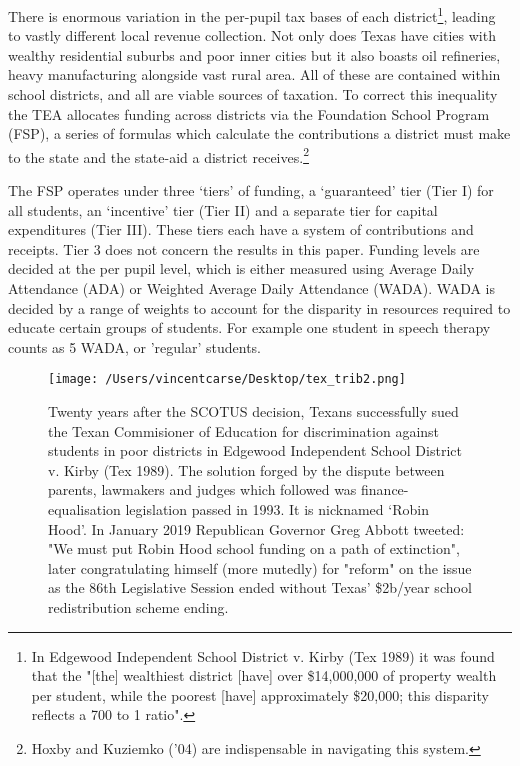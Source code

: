 \documentclass[11pt]{article}
\begin{document}
There is enormous variation in the per-pupil tax bases of each district\footnote{In Edgewood Independent School District v. Kirby (Tex 1989) it was found that the "[the] wealthiest district [have] over \$14,000,000 of property wealth per student, while the poorest [have] approximately \$20,000; this disparity reflects a 700 to 1 ratio". }, leading to vastly different local revenue collection. Not only does Texas have cities with wealthy residential suburbs and poor inner cities but it also boasts oil refineries, heavy manufacturing alongside vast rural area. All of these are contained within school districts, and all are viable sources of taxation. To correct this inequality the TEA allocates funding across districts via the Foundation School Program (FSP), a series of formulas which calculate the contributions a district must make to the state and the state-aid a district receives.\footnote{Hoxby and Kuziemko ('04) are indispensable in navigating this system.} 

The FSP operates under three ‘tiers’ of funding, a ‘guaranteed’ tier (Tier I) for all students, an ‘incentive’ tier (Tier II) and a separate tier for capital expenditures (Tier III). These tiers each have a system of contributions and receipts. Tier 3 does not concern the results in this paper. Funding levels are decided at the per pupil level, which is either measured using Average Daily Attendance (ADA) or Weighted Average Daily Attendance (WADA). WADA is decided by a range of weights to account for the disparity in resources required to educate certain groups of students. For example one student in speech therapy counts as 5 WADA, or 'regular' students.  

\begin{figure}
    \label{image-myimage}
    \texttt{[image: /Users/vincentcarse/Desktop/tex\_trib2.png]}
    \caption{Twenty years after the SCOTUS decision, Texans successfully sued the Texan Commisioner of Education for discrimination against students in poor districts in Edgewood Independent School District v. Kirby (Tex 1989). The solution forged by the dispute between parents, lawmakers and judges which followed was finance-equalisation legislation passed in 1993. It is nicknamed ‘Robin Hood’. In January 2019 Republican Governor Greg Abbott tweeted: "We must put Robin Hood school funding on a path of extinction", later congratulating himself (more mutedly) for "reform" on the issue as the 86th Legislative Session ended without Texas’ \$2b/year school redistribution scheme ending.}
\end{figure}
\end{document}
